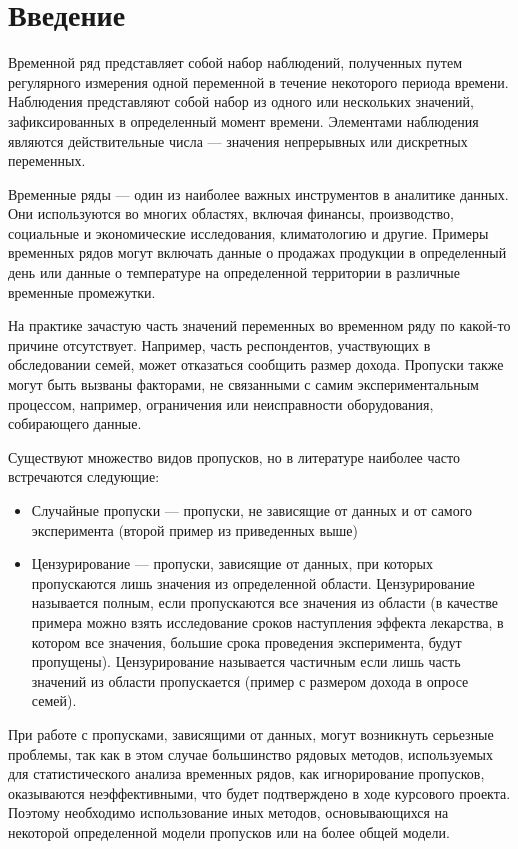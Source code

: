 \section{Введение}

    Временной ряд представляет собой набор наблюдений, полученных путем регулярного измерения одной переменной
    в течение некоторого периода времени. Наблюдения представляют собой набор из одного или нескольких значений, 
    зафиксированных в определенный момент времени. Элементами наблюдения являются действительные числа --- значения 
    непрерывных или дискретных переменных.

	Временные ряды --- один из наиболее важных инструментов в аналитике данных. Они используются во многих областях, 
    включая финансы, производство, социальные и экономические исследования, климатологию и другие. Примеры временных 
    рядов могут включать данные о продажах продукции в определенный день или данные о температуре на определенной 
    территории в различные временные промежутки.

	На практике зачастую часть значений переменных во временном ряду по какой-то причине отсутствует. Например, 
    часть респондентов, участвующих в обследовании семей, может отказаться сообщить размер дохода. Пропуски также 
    могут быть вызваны факторами, не связанными с самим экспериментальным процессом, например, ограничения или 
    неисправности оборудования, собирающего данные.
    
    Существуют множество видов пропусков, но в литературе наиболее часто встречаются следующие:
    \begin{itemize}
        \item Случайные пропуски --- пропуски, не зависящие от данных и от самого эксперимента (второй пример 
        из приведенных выше)
        \item Цензурирование --- пропуски, зависящие от данных, при которых пропускаются лишь значения из определенной 
        области. Цензурирование называется полным, если пропускаются все значения из области (в качестве примера 
        можно взять исследование сроков наступления эффекта лекарства, в котором все значения, большие срока 
        проведения эксперимента, будут пропущены). Цензурирование называется частичным если лишь часть значений из 
        области пропускается (пример с размером дохода в опросе семей).
    \end{itemize}

    При работе с пропусками, зависящими от данных, могут возникнуть серьезные проблемы, так как в этом случае 
    большинство рядовых методов, используемых для статистического анализа временных рядов, как игнорирование 
    пропусков, оказываются неэффективными, что будет подтверждено в ходе курсового проекта. Поэтому необходимо 
    использование иных методов, основывающихся на некоторой определенной модели пропусков или на более общей модели.
